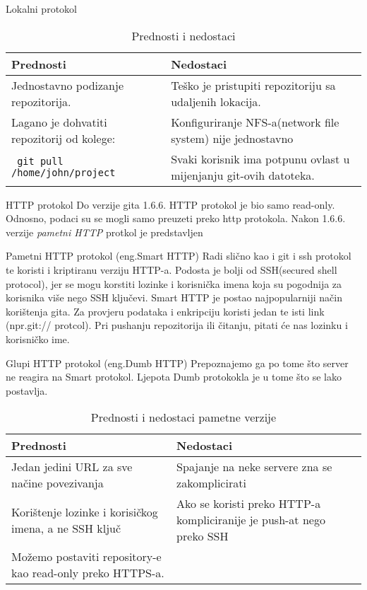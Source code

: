 \documentclass[10pt]{beamer}
\begin{document}
	\begin{frame}{Lokalni protokol}
		\begin{table}
			\caption{Prednosti i nedostaci}
			\begin{tabular}{||p{130pt}|p{130pt}||}
				\hline
				\textbf{Prednosti} & \textbf{Nedostaci} \\ \hline
				Jednostavno podizanje repozitorija. & Teško je pristupiti repozitoriju 	sa udaljenih lokacija. \\
				Lagano je dohvatiti repozitorij od kolege: & Konfiguriranje NFS-a(network file system) nije jednostavno\\ \texttt{ git pull /home/john/project}  & Svaki korisnik ima potpunu ovlast u mijenjanju git-ovih datoteka. \\
				\hline
			\end{tabular}
		\end{table}

	\end{frame}
	\begin{frame}{HTTP protokol}
		Do verzije gita 1.6.6. HTTP protokol je bio samo read-only. Odnosno, podaci su se mogli samo preuzeti preko http protokola.
		Nakon 1.6.6. verzije \textit{pametni HTTP} protkol je predstavljen 
		
	\end{frame}
	\begin{frame}{Pametni HTTP protokol (eng.Smart HTTP)}
		Radi slično kao i git i ssh protokol te koristi i kriptiranu verziju HTTP-a.
		Podosta je bolji od SSH(secured shell protocol), jer se mogu korstiti  lozinke i korisnička imena koja su pogodnija za korisnika više nego SSH ključevi. \newline
		Smart HTTP je postao najpopularniji način korištenja gita. Za provjeru podataka i enkripciju koristi jedan te isti link (npr.git:// protcol).
		Pri pushanju repozitorija ili čitanju, pitati će nas lozinku i korisničko ime.
	\end{frame}
	\begin{frame}{Glupi HTTP protokol (eng.Dumb HTTP)}
		Prepoznajemo ga po tome što server ne reagira na Smart protokol.
		Ljepota Dumb protokokla je u tome što se lako postavlja.
	\end{frame}
	\begin{frame}
	\begin{table}
			\caption{Prednosti i nedostaci pametne verzije}
			\begin{tabular}{||p{130pt}|p{130pt}||}
				\hline
				\textbf{Prednosti} & \textbf{Nedostaci} \\ \hline
				Jedan jedini URL za sve načine povezivanja & Spajanje na neke servere zna se zakomplicirati \\
				Korištenje lozinke i korisičkog imena, a ne SSH ključ & Ako se koristi preko HTTP-a kompliciranije je push-at nego preko SSH\\  
				Možemo postaviti repository-e kao read-only preko HTTPS-a. & \\
				\hline
			\end{tabular}
		\end{table}
	\end{frame}
\end{document}
